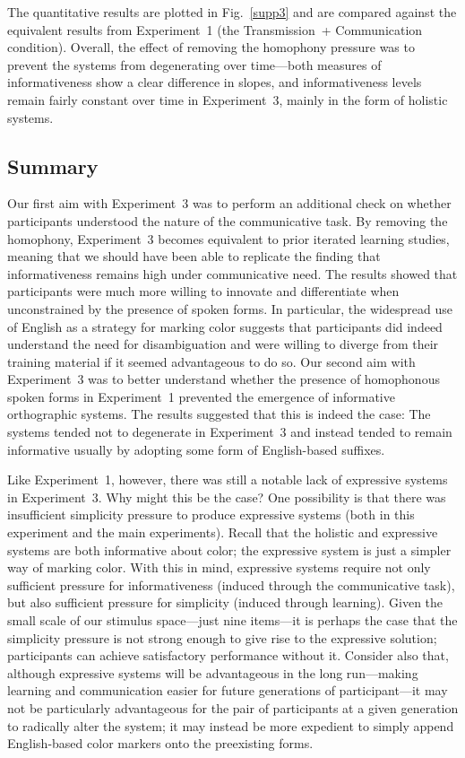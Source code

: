 \documentclass[doc,biblatex]{apa7}
\begin{document}
The quantitative results are plotted in Fig.~\ref{supp3} and are compared against the equivalent results from Experiment~1 (the Transmission~+ Communication condition). Overall, the effect of removing the homophony pressure was to prevent the systems from degenerating over time---both measures of informativeness show a clear difference in slopes, and informativeness levels remain fairly constant over time in Experiment~3, mainly in the form of holistic systems.

\subsection{Summary}

Our first aim with Experiment~3 was to perform an additional check on whether participants understood the nature of the communicative task. By removing the homophony, Experiment~3 becomes equivalent to prior iterated learning studies, meaning that we should have been able to replicate the finding that informativeness remains high under communicative need. The results showed that participants were much more willing to innovate and differentiate when unconstrained by the presence of spoken forms. In particular, the widespread use of English as a strategy for marking color suggests that participants did indeed understand the need for disambiguation and were willing to diverge from their training material if it seemed advantageous to do so. Our second aim with Experiment~3 was to better understand whether the presence of homophonous spoken forms in Experiment~1 prevented the emergence of informative orthographic systems. The results suggested that this is indeed the case: The systems tended not to degenerate in Experiment~3 and instead tended to remain informative usually by adopting some form of English-based suffixes.

Like Experiment~1, however, there was still a notable lack of expressive systems in Experiment~3. Why might this be the case? One possibility is that there was insufficient simplicity pressure to produce expressive systems (both in this experiment and the main experiments). Recall that the holistic and expressive systems are both informative about color; the expressive system is just a simpler way of marking color. With this in mind, expressive systems require not only sufficient pressure for informativeness (induced through the communicative task), but also sufficient pressure for simplicity (induced through learning). Given the small scale of our stimulus space---just nine items---it is perhaps the case that the simplicity pressure is not strong enough to give rise to the expressive solution; participants can achieve satisfactory performance without it. Consider also that, although expressive systems will be advantageous in the long run---making learning and communication easier for future generations of participant---it may not be particularly advantageous for the pair of participants at a given generation to radically alter the system; it may instead be more expedient to simply append English-based color markers onto the preexisting forms.
\end{document}
